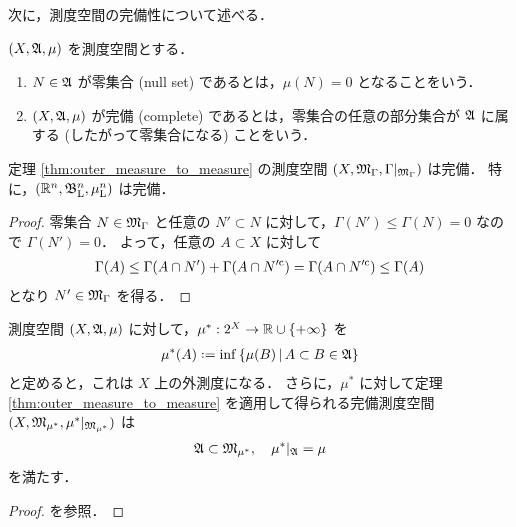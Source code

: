 次に，測度空間の完備性について述べる．

\begin{definition}
    $(X,\mathfrak{A},\mu)$ を測度空間とする．
    \begin{enumerate}
        \item $N\in\mathfrak{A}$ が零集合 (null set) であるとは，$\mu(N)=0$ となることをいう．
        \item $(X,\mathfrak{A},\mu)$ が完備 (complete) であるとは，零集合の任意の部分集合が $\mathfrak{A}$ に属する (したがって零集合になる) ことをいう．
    \end{enumerate}
\end{definition}

\begin{proposition}
    定理 \ref{thm:outer_measure_to_measure} の測度空間 $(X,\mathfrak{M}_\Gamma,\Gamma\vert_{\mathfrak{M}_\Gamma})$ は完備．
    特に，$(\mathbb{R}^n,\mathfrak{B}_{\mathrm{L}}^n,\mu_{\mathrm{L}}^n)$ は完備．
\end{proposition}

\begin{proof}
    零集合 $N\in\mathfrak{M}_\Gamma$ と任意の $N'\subset N$ に対して，$\Gamma(N')\le\Gamma(N)=0$ なので $\Gamma(N')=0$．
    よって，任意の $A\subset X$ に対して
    \begin{align*}
        \Gamma(A)
        \le\Gamma(A\cap N')+\Gamma(A\cap N'^{\mathrm{c}})
        =\Gamma(A\cap N'^{\mathrm{c}})
        \le\Gamma(A)
    \end{align*}
    となり $N'\in\mathfrak{M}_\Gamma$ を得る．
\end{proof}

\begin{theorem}\label{thm:measure_completion}
    測度空間 $(X,\mathfrak{A},\mu)$ に対して，$\mu^\ast:2^X\to\mathbb{R}\cup\{+\infty\}$ を
    \begin{align*}
        \mu^\ast(A)\defeq\inf\left\{
            \mu(B)\,\middle\vert\,A\subset B\in\Afrak
        \right\}
    \end{align*}
    と定めると，これは $X$ 上の外測度になる．
    さらに，$\mu^\ast$ に対して定理 \ref{thm:outer_measure_to_measure} を適用して得られる完備測度空間
    $(X,\mathfrak{M}_{\mu^*},\mu^\ast\vert_{\mathfrak{M}_{\mu^\ast}})$ は
    \begin{align*}
        \mathfrak{A}\subset\mathfrak{M}_{\mu^*},\quad
        \mu^\ast\vert_{\mathfrak{A}}=\mu
    \end{align*}
    を満たす．
\end{theorem}

\begin{proof}
    \cite[定理 8.4]{It63} を参照．
\end{proof}

